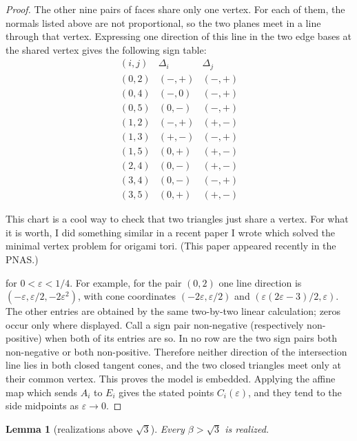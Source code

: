 \documentclass[12pt]{article}
\newtheorem{lemma}{Lemma}
\newcommand{\review}[1]{\begin{reviewbox}#1\end{reviewbox}}
\begin{document}
\begin{proof}
The other nine pairs of faces share only one vertex.  For each of them,
the normals listed above are not proportional, so the two planes meet in a
line through that vertex.  Expressing one direction of this line in the two edge bases
at the shared vertex gives the following sign table:
\[
\begin{array}{c|c|c}
(i,j)&\Delta_i&\Delta_j\\ \hline
(0,2)&(-,+)&(-,+)\\
(0,4)&(-,0)&(-,+)\\
(0,5)&(0,-)&(-,+)\\
(1,2)&(-,+)&(+,-)\\
(1,3)&(+,-)&(-,+)\\
(1,5)&(0,+)&(+,-)\\
(2,4)&(0,-)&(+,-)\\
(3,4)&(0,-)&(-,+)\\
(3,5)&(0,+)&(+,-)
\end{array}
\]


\review{This chart is a cool way to check that two triangles just share a vertex. For what it is worth, I did something similar in a recent paper I wrote which solved the minimal vertex problem for origami tori. (This paper appeared recently in the PNAS.)}

for \(0<\varepsilon<1/4\).  For example, for the pair \((0,2)\)
one line direction is \((-\varepsilon,\varepsilon/2,-2\varepsilon^2)\),
with cone coordinates
\((-2\varepsilon,\varepsilon/2)\) and
\((\varepsilon(2\varepsilon-3)/2,\varepsilon)\).  The other entries are
obtained by the same two-by-two linear calculation; zeros occur only
where displayed.  Call a sign pair non-negative (respectively
non-positive) when both of its entries are so.  In no row are the two
sign pairs both non-negative or both non-positive.  Therefore neither direction of the intersection line
lies in both closed tangent cones, and the two closed triangles meet only
at their common vertex.  This proves the model is embedded.  Applying the affine map which sends \(A_i\) to \(E_i\) gives
the stated points \(C_i(\varepsilon)\), and they tend to the side
midpoints as \(\varepsilon\to0\).
\end{proof}


\begin{lemma}[realizations above \(\sqrt3\)]\label{lem:upper}
Every \(\beta>\sqrt3\) is realized.
\end{lemma}
\end{document}
